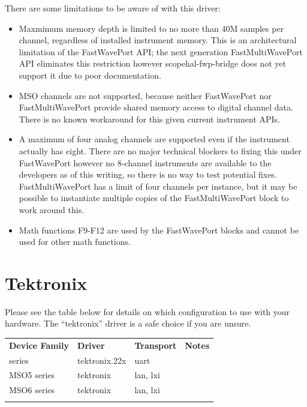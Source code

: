 There are some limitations to be aware of with this driver:
\begin{itemize}

\item Maxmimum memory depth is limited to no more than 40M samples per channel, regardless of installed instrument
memory. This is an architectural limitation of the FastWavePort API; the next generation FastMultiWavePort API eliminates
this restriction however scopehal-fwp-bridge does not yet support it due to poor documentation.

\item MSO channels are not supported, because neither FastWavePort nor FastMultiWavePort provide shared memory access to
digital channel data. There is no known workaround for this given current instrument APIs.

\item A maximum of four analog channels are supported even if the instrument actually has eight. There are no major
technical blockers to fixing this under FastWavePort however no 8-channel instruments are available to the developers as
of this writing, so there is no way to test potential fixes. FastMultiWavePort has a limit of four channels per instance,
but it may be possible to instantiate multiple copies of the FastMultiWavePort block to work around this.

\item Math functions F9-F12 are used by the FastWavePort blocks and cannot be used for other math functions.

\end{itemize}

\section{Tektronix}

Please see the table below for details on which configuration to use with your hardware. The ``tektronix'' driver is a safe choice if you are unsure.

\begin{tabularx}{16cm}{lllX}
\thickhline
\textbf{Device Family} & \textbf{Driver} & \textbf{Transport} & \textbf{Notes} \\
\thickhline
220 series & tektronix.22x & uart &  \\
\thickhline
MSO5 series & tektronix & lan, lxi &  \\
\thinhline
MSO6 series & tektronix & lan, lxi &  \\
\thickhline
\end{tabularx}

